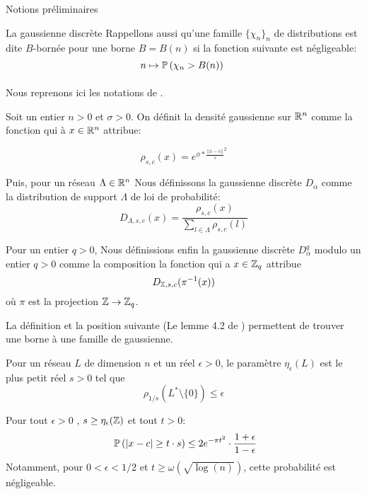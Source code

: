\begin{section}{Notions préliminaires}
\begin{subsection}{La gaussienne discrète}
	Rappellons aussi qu'une famille $\{\chi_n\}_n$
	de distributions est dite $B$-bornée pour une borne 
	$B = B(n)$ si la fonction suivante est négligeable:
		\[n \mapsto \PP\left(\chi_n > B(n)\right) \]

	\paragraph{}
	Nous reprenons ici les notations de \cite{STOC:GenPeiVai08}.

	Soit un entier $n > 0$  et $\sigma > 0$. On définit la densité
	gaussienne sur $\mathbb{R}^n$ comme la fonction qui à $x\in\mathbb{R}^n$
	attribue:

	\[\rho_{s,c}(x) = e^{\phi * {\frac{||x-c||}{s}}^2} \]

	Puis, pour un réseau $\Lambda \in \mathbb{R}^n$ Nous définissons la gaussienne discrète
	$D_\alpha$ comme la distribution de support $\Lambda$ de loi de
	probabilité: 	
	\[ D_{\Lambda, s, c}(x) = \frac{\rho_{s,c}(x)}{\sum_{l\in \Lambda}\rho_{s,c}(l)}\]

	Pour un entier $q > 0$,  
	Nous définissions enfin la gaussienne discrète $D^q_{\alpha}$ modulo un entier $q > 0$ comme la
		composition la fonction qui a $x \in \mathbb{Z}_q$ attribue   
		\[ D_{\mathbb{Z}, s, c}(\pi^{-1}(x)) \]
	où $\pi$ est la projection $\mathbb{Z} \rightarrow \mathbb{Z}_q$.

La définition et la position suivante 
(Le lemme 4.2 de \cite{STOC:GenPeiVai08})
permettent de trouver une borne à une famille de gaussienne.
\begin{definition}
Pour un réseau $L$ de dimension $n$ et un réel $\epsilon > 0$, 
	le paramètre $\eta_\epsilon(L)$ est le plus petit réel
	$s>0$ tel que 
	\[\rho_{1/s}(L^* \setminus \{0\}) \leq \epsilon\]
\end{definition}
	\begin{prop}
	Pour tout $\epsilon > 0$ , $s \geq \eta_{\epsilon}(\mathbb{Z})$ et tout
	$t>0$:
	\[ \PP\left(|x-c| \geq t\cdot s\right) \leq 2 e^{-\pi t^2}
	\cdot \frac{1+\epsilon}{1-\epsilon} \]
	Notamment, pour $0 < \epsilon  < 1/2$ et $t \geq \omega(\sqrt{\log(n)})$, cette probabilité est négligeable.
	\end{prop}
	\end{subsection}
\end{section}
